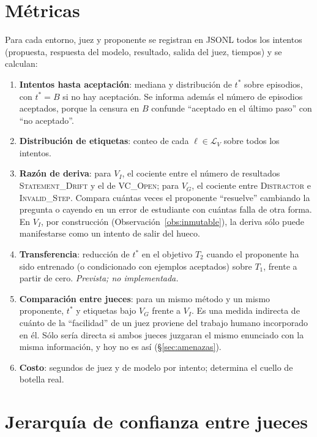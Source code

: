 \documentclass[11pt,a4paper]{article}
\theoremstyle{definition}
\theoremstyle{remark}
\newcommand{\lab}[1]{\textsc{#1}}
\begin{document}
\section{Métricas}\label{sec:metricas}

Para cada entorno, juez y proponente se registran en JSONL todos los intentos (propuesta, respuesta del modelo, resultado, salida del juez, tiempos) y se calculan:
\begin{enumerate}
  \item \textbf{Intentos hasta aceptación}: mediana y distribución de $t^*$ sobre episodios, con $t^* = B$ si no hay aceptación. Se informa además el número de episodios aceptados, porque la censura en $B$ confunde ``aceptado en el último paso'' con ``no aceptado''.
  \item \textbf{Distribución de etiquetas}: conteo de cada $\ell \in \mathcal{L}_V$ sobre todos los intentos.
  \item \textbf{Razón de deriva}: para $V_I$, el cociente entre el número de resultados \lab{Statement\_Drift} y el de \lab{VC\_Open}; para $V_G$, el cociente entre \lab{Distractor} e \lab{Invalid\_Step}. Compara cuántas veces el proponente ``resuelve'' cambiando la pregunta o cayendo en un error de estudiante con cuántas falla de otra forma. En $V_I$, por construcción (Observación~\ref{obs:inmutable}), la deriva sólo puede manifestarse como un intento de salir del hueco.
  \item \textbf{Transferencia}: reducción de $t^*$ en el objetivo $T_2$ cuando el proponente ha sido entrenado (o condicionado con ejemplos aceptados) sobre $T_1$, frente a partir de cero. \emph{Prevista; no implementada.}
  \item \textbf{Comparación entre jueces}: para un mismo método y un mismo proponente, $t^*$ y etiquetas bajo $V_G$ frente a $V_I$. Es una medida indirecta de cuánto de la ``facilidad'' de un juez proviene del trabajo humano incorporado en él. Sólo sería directa si ambos jueces juzgaran el mismo enunciado con la misma información, y hoy no es así (§\ref{sec:amenazas}).
  \item \textbf{Costo}: segundos de juez y de modelo por intento; determina el cuello de botella real.
\end{enumerate}

\section{Jerarquía de confianza entre jueces}\label{sec:confianza}
\end{document}
